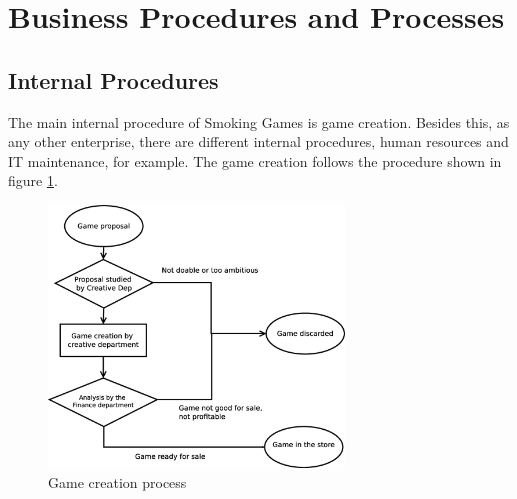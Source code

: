 \section{Business Procedures and Processes}




\subsection{Internal Procedures}
The main internal procedure of Smoking Games is game creation. Besides this, as any other enterprise, there are different internal procedures, human resources and IT maintenance, for example. The game creation follows the procedure shown in figure \ref{fig:proc_game_creation}.

\begin{figure}[h] \centering
\includegraphics[width={0.7\textwidth}]{pictures/game_creation_process.eps}
\caption{Game creation process}
\label{fig:proc_game_creation}
\end{figure}

